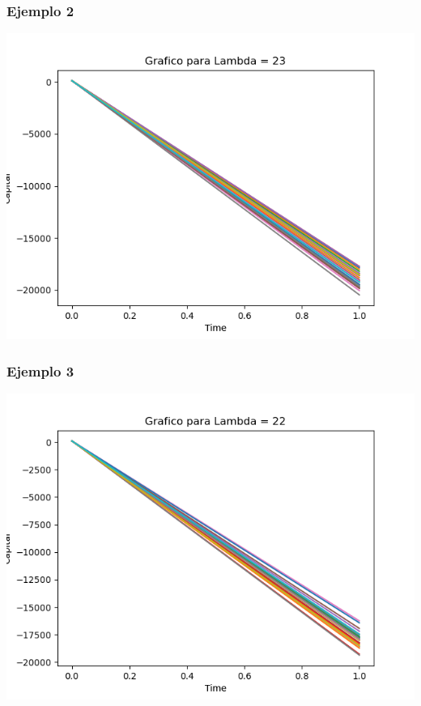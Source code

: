 \documentclass{article}
\begin{document}
\subsubsection{Ejemplo 2}
\includegraphics[scale = 0.8]{dis2.png}

\subsubsection{Ejemplo 3}
\includegraphics[scale = 0.8]{dis3.png}
\end{document}

